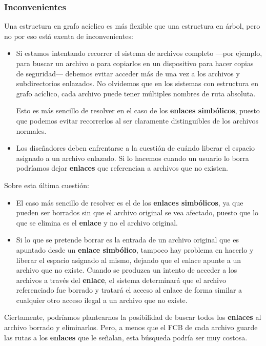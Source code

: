 \subsubsection{Inconvenientes}\label{_inconvenientes}

Una estructura en grafo acíclico es más flexible que una estructura en
árbol, pero no por eso está exenta de inconvenientes:

\begin{itemize}
\item
  Si estamos intentando recorrer el sistema de archivos completo ---por
  ejemplo, para buscar un archivo o para copiarlos en un dispositivo
  para hacer copias de seguridad--- debemos evitar acceder más de una
  vez a los archivos y subdirectorios enlazados. No olvidemos que en los
  sistemas con estructura en grafo acíclico, cada archivo puede tener
  múltiples nombres de ruta absoluta.

  Esto es más sencillo de resolver en el caso de los \textbf{enlaces
  simbólicos}, puesto que podemos evitar recorrerlos al ser claramente
  distinguibles de los archivos normales.
\item
  Los diseñadores deben enfrentarse a la cuestión de cuándo liberar el
  espacio asignado a un archivo enlazado. Si lo hacemos cuando un
  usuario lo borra podríamos dejar \textbf{enlaces} que referencian a
  archivos que no existen.
\end{itemize}

Sobre esta última cuestión:

\begin{itemize}
\item
  El caso más sencillo de resolver es el de los \textbf{enlaces
  simbólicos}, ya que pueden ser borrados sin que el archivo original se
  vea afectado, puesto que lo que se elimina es el \textbf{enlace} y no
  el archivo original.
\item
  Si lo que se pretende borrar es la entrada de un archivo original que
  es apuntado desde un \textbf{enlace simbólico}, tampoco hay problema
  en hacerlo y liberar el espacio asignado al mismo, dejando que el
  enlace apunte a un archivo que no existe. Cuando se produzca un
  intento de acceder a los archivos a través del \textbf{enlace}, el
  sistema determinará que el archivo referenciado fue borrado y tratará
  el acceso al enlace de forma similar a cualquier otro acceso ilegal a
  un archivo que no existe.
\end{itemize}

Ciertamente, podríamos plantearnos la posibilidad de buscar todos los
\textbf{enlaces} al archivo borrado y eliminarlos. Pero, a menos que el
FCB de cada archivo guarde las rutas a los \textbf{enlaces} que le
señalan, esta búsqueda podría ser muy costosa.

